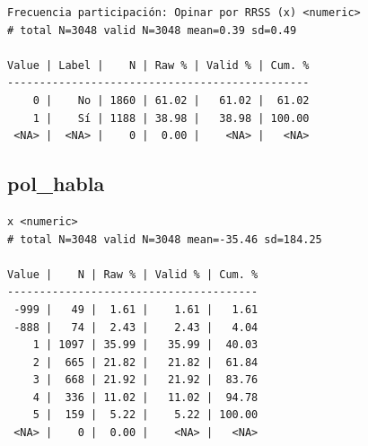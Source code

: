 \documentclass[
  letterpaper,
  DIV=11,
  numbers=noendperiod]{scrreprt}
\newenvironment{Shaded}{\begin{snugshade}}{\end{snugshade}}
\newcommand{\FunctionTok}[1]{\textcolor[rgb]{0.28,0.35,0.67}{#1}}
\newcommand{\NormalTok}[1]{\textcolor[rgb]{0.00,0.23,0.31}{#1}}
\newcommand{\SpecialCharTok}[1]{\textcolor[rgb]{0.37,0.37,0.37}{#1}}
\begin{document}
\begin{verbatim}
Frecuencia participación: Opinar por RRSS (x) <numeric> 
# total N=3048 valid N=3048 mean=0.39 sd=0.49

Value | Label |    N | Raw % | Valid % | Cum. %
-----------------------------------------------
    0 |    No | 1860 | 61.02 |   61.02 |  61.02
    1 |    Sí | 1188 | 38.98 |   38.98 | 100.00
 <NA> |  <NA> |    0 |  0.00 |    <NA> |   <NA>
\end{verbatim}

\hypertarget{pol_habla}{%
\subsection{pol\_habla}\label{pol_habla}}

\begin{Shaded}
\end{Shaded}

\begin{verbatim}
x <numeric> 
# total N=3048 valid N=3048 mean=-35.46 sd=184.25

Value |    N | Raw % | Valid % | Cum. %
---------------------------------------
 -999 |   49 |  1.61 |    1.61 |   1.61
 -888 |   74 |  2.43 |    2.43 |   4.04
    1 | 1097 | 35.99 |   35.99 |  40.03
    2 |  665 | 21.82 |   21.82 |  61.84
    3 |  668 | 21.92 |   21.92 |  83.76
    4 |  336 | 11.02 |   11.02 |  94.78
    5 |  159 |  5.22 |    5.22 | 100.00
 <NA> |    0 |  0.00 |    <NA> |   <NA>
\end{verbatim}
\end{document}

